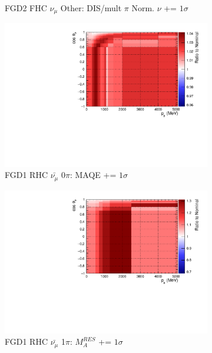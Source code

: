 \begin{figure}[!htbp]
\begin{subfigure}{.32\textwidth}
  \caption{FGD2 FHC $\nu_{\mu}$ Other: DIS/mult $\pi$ Norm. $\nu$ += $1\sigma$}
  \label{fig:sigvar_FGD2_numuCC_other}
\end{subfigure}
\centering
\begin{subfigure}{.32\textwidth}
  \centering
  \includegraphics[width=0.85\linewidth]{figs/sig/FGD1_anti-numuCC_0pi_MAQE_+1sig.pdf}
  \caption{FGD1 RHC $\bar{\nu_{\mu}}$ 0$\pi$: MAQE += $1\sigma$}
  \label{fig:sigvar_FGD1_anti-numuCC_0pi}
\end{subfigure}
\begin{subfigure}{.32\textwidth}
  \centering
  \includegraphics[width=0.85\linewidth]{figs/sig/FGD1_anti-numuCC_1pi_MARES_+1sig.pdf}
  \caption{FGD1 RHC $\bar{\nu_{\mu}}$ 1$\pi$: $M^{RES}_{A}$ += $1\sigma$}
  \label{fig:sigvar_FGD1_anti-numuCC_1pi}
\end{subfigure}
\begin{subfigure}{.32\textwidth}
  \centering

\end{subfigure}
\end{figure}
